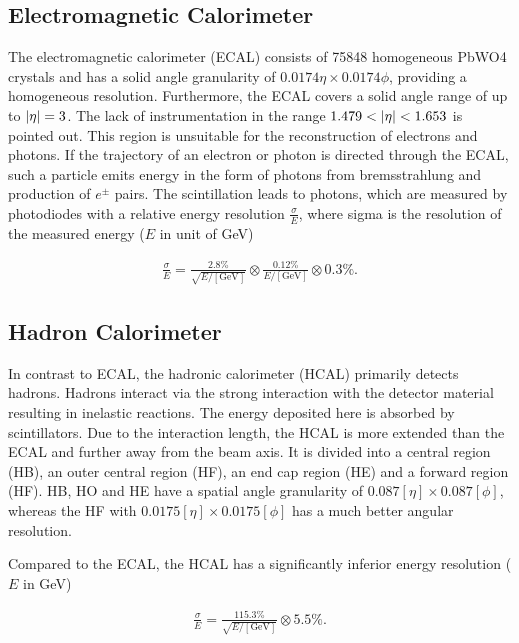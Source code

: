 \documentclass[12pt, a4paper]{thesis}
\begin{document}
\subsection{Electromagnetic Calorimeter}
\label{sec:orgf218141}

The electromagnetic calorimeter (ECAL) consists of 75848 homogeneous
PbWO4 crystals and has a solid angle granularity of \(0.0174 \eta
\times 0.0174 \phi\), providing a homogeneous resolution. Furthermore,
the ECAL covers a solid angle range of up to \(\abs{\eta} = 3\). The
lack of instrumentation in the range \(1.479 < \abs{\eta} < 1.653\) is
pointed out. This region is unsuitable for the reconstruction of
electrons and photons.  If the trajectory of an electron or photon is
directed through the ECAL, such a particle emits energy in the form of
photons from bremsstrahlung and production of $e^{\pm}$ pairs. The
scintillation leads to photons, which are measured by photodiodes with
a relative energy resolution \(\frac{\sigma}{E}\), where sigma is the
resolution of the measured energy (\(E\) in unit of GeV)

\begin{align}
 \frac{\sigma}{E} = \frac{2.8 \%}{\sqrt{E/[\text{GeV}]}} \otimes  \frac{0.12 \%}{E/[\text{GeV}]} \otimes 0.3 \%.
\end{align}


\subsection{Hadron Calorimeter}
\label{sec:orgde6b415}
In contrast to ECAL, the hadronic calorimeter (HCAL) primarily detects
hadrons. Hadrons interact via the strong interaction with the detector
material resulting in inelastic reactions.  The energy deposited here
is absorbed by scintillators. Due to the interaction length, the HCAL
is more extended than the ECAL and further away from the beam axis. It
is divided into a central region (HB), an outer central region (HF),
an end cap region (HE) and a forward region (HF). HB, HO and HE have a
spatial angle granularity of \(0.087[\eta] \times 0.087 [\phi]\),
whereas the HF with \(0.0175 [\eta] \times 0.0175 [\phi]\) has a much
better angular resolution.

Compared to the ECAL, the HCAL has a significantly inferior energy
resolution (\(E\) in GeV)

\begin{align}
\frac{\sigma}{E} =  \frac{115.3 \%}{\sqrt{E/[\text{GeV}]}} \otimes 5.5 \%.
\end{align}
\end{document}
